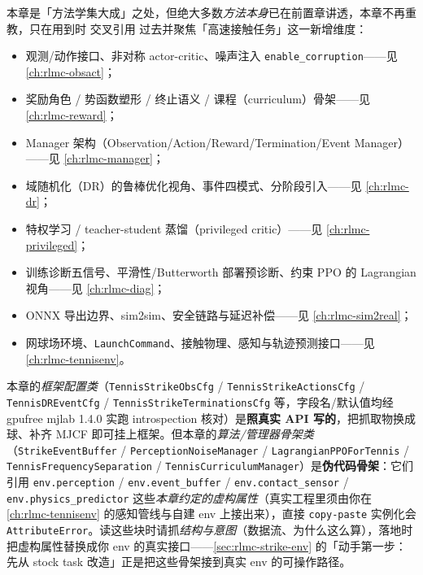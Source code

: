 \begin{note}
本章是「方法学集大成」之处，但绝大多数\emph{方法本身}已在前置章讲透，本章不再重教，只在用到时 交叉引用 过去并聚焦「高速接触任务」这一新增维度：
\begin{itemize}
  \item 观测/动作接口、非对称 actor-critic、噪声注入 \verb|enable_corruption|——见 \cref{ch:rlmc-obsact}；
  \item 奖励角色 / 势函数塑形 / 终止语义 / 课程（curriculum）骨架——见 \cref{ch:rlmc-reward}；
  \item Manager 架构（Observation/Action/Reward/Termination/Event Manager）——见 \cref{ch:rlmc-manager}；
  \item 域随机化（DR）的鲁棒优化视角、事件四模式、分阶段引入——见 \cref{ch:rlmc-dr}；
  \item 特权学习 / teacher-student 蒸馏（privileged critic）——见 \cref{ch:rlmc-privileged}；
  \item 训练诊断五信号、平滑性/Butterworth 部署预诊断、约束 PPO 的 Lagrangian 视角——见 \cref{ch:rlmc-diag}；
  \item ONNX 导出边界、sim2sim、安全链路与延迟补偿——见 \cref{ch:rlmc-sim2real}；
  \item 网球场环境、\texttt{LaunchCommand}、接触物理、感知与轨迹预测接口——见 \cref{ch:rlmc-tennisenv}。
\end{itemize}
\end{note}

\begin{note}\label{note:rlmc-strike-pseudocode}
本章的\emph{框架配置类}（\verb|TennisStrikeObsCfg| / \verb|TennisStrikeActionsCfg| / \verb|TennisDREventCfg| / \verb|TennisStrikeTerminationsCfg| 等，字段名/默认值均经 gpufree mjlab 1.4.0 实跑 introspection 核对）是\textbf{照真实 API 写的}，把抓取物换成球、补齐 MJCF 即可挂上框架。但本章的\emph{算法/管理器骨架类}（\verb|StrikeEventBuffer| / \verb|PerceptionNoiseManager| / \verb|LagrangianPPOForTennis| / \verb|TennisFrequencySeparation| / \verb|TennisCurriculumManager|）是\textbf{伪代码骨架}：它们引用 \verb|env.perception| / \verb|env.event_buffer| / \verb|env.contact_sensor| / \verb|env.physics_predictor| 这些\emph{本章约定的虚构属性}（真实工程里须由你在 \cref{ch:rlmc-tennisenv} 的感知管线与自建 env 上接出来），直接 \verb|copy-paste| 实例化会 \verb|AttributeError|。读这些块时请抓\emph{结构与意图}（数据流、为什么这么算），落地时把虚构属性替换成你 env 的真实接口——\cref{sec:rlmc-strike-env} 的「动手第一步：先从 stock task 改造」正是把这些骨架接到真实 env 的可操作路径。
\end{note}

